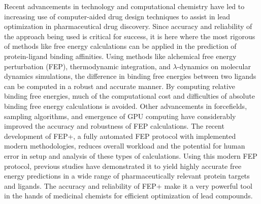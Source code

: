 \documentclass[journal=jctcce,manuscript=article]{achemso}
\begin{document}
Recent advancements in technology and computational chemistry have led to increasing use of computer-aided drug design techniques to assist in lead optimization in pharmaceutical drug discovery.
Since accuracy and reliability of the approach being used is critical for success, it is here where the most rigorous of methods like free energy calculations can be applied in the prediction of protein-ligand binding affinities. 
Using methods like alchemical free energy perturbation (FEP), thermodynamic integration, and $\lambda$-dynamics on molecular dynamics simulations, the difference in binding free energies between two ligands can be computed in a robust and accurate manner.
By computing relative binding free energies, much of the computational cost and difficulties of absolute binding free energy calculations is avoided\cite{doi:10.1021/ct5000296,chipot2007free,chodera2011alchemical,knight2009lambda,zheng2008random,gallicchio2011advances,doi:10.1021/ct500161f}.
Other advancements in forcefields, sampling algorithms, and emergence of GPU computing have considerably improved the accuracy and robustness of FEP calculations. 
The recent development of FEP+, a fully automated FEP protocol with implemented modern methodologies, reduces overall workload and the potential for human error in setup and analysis of these types of calculations.
Using this modern FEP protocol, previous studies\cite{FEPplus} have demonstrated it to yield highly accurate free energy predictions in a wide range of pharmaceutically relevant protein targets and ligands.
The accuracy and reliability of FEP+ make it a very powerful tool in the hands of medicinal chemists for efficient optimization of lead compounds.
\end{document}
